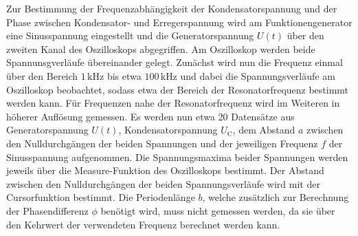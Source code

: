 Zur Bestimmung der Frequenzabhängigkeit der Kondensatorspannung und der Phase zwischen Kondensator- und Erregerspannung wird am Funktionengenerator eine Sinusspannung eingestellt und die Generatorspannung $U(t)$ über den zweiten Kanal des Oszilloskops abgegriffen.
Am Oszilloskop werden beide Spannunsgverläufe übereinander gelegt.
Zunächst wird nun die Frequenz einmal über den Bereich $1 \,\si{\kilo\Hz}$ bis etwa $100 \,\si{\kilo\Hz}$ und dabei die Spannungsverläufe am Oszilloskop beobachtet, sodass etwa der Bereich der Resonatorfrequenz bestimmt werden kann.
Für Frequenzen nahe der Resonatorfrequenz wird im Weiteren in höherer Auflösung gemessen.
Es werden nun etwa 20 Datensätze aus Generatorspannung $U(t)$, Kondensatorspannung $U_\text{C}$, dem Abstand $a$ zwischen den Nulldurchgängen der beiden Spannungen und der jeweiligen Frequenz $f$ der Sinusspannung aufgenommen.
Die Spannungsmaxima beider Spannungen werden jeweils über die Measure-Funktion des Oszilloskops bestimmt.
Der Abstand zwischen den Nulldurchgängen der beiden Spannungsverläufe wird mit der Cursorfunktion bestimmt.
Die Periodenlänge $b$, welche zusätzlich zur Berechnung der Phasendifferenz $\phi$ benötigt wird, muss nicht gemessen werden, da sie über den Kehrwert der verwendeten Frequenz berechnet werden kann.
